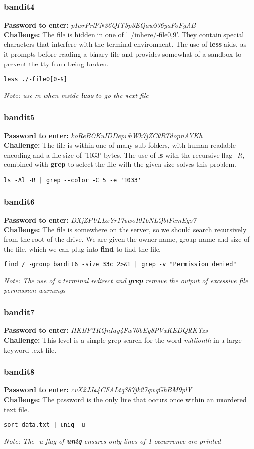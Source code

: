 \documentclass[a4paper]{article}
\newcommand{\pass}[1]{\textbf{Password to enter:} \textit{#1}\\}
\newcommand{\chall}{\textbf{Challenge:} }
\begin{document}
\subsubsection{bandit4}
\pass{pIwrPrtPN36QITSp3EQaw936yaFoFgAB}
\chall The file is hidden in one of '~/inhere/-file{0,9}'. They contain special characters that interfere with the terminal environment. The use of \textbf{less} aids, as it prompts before reading a binary file and provides somewhat of a sandbox to prevent the tty from being broken.
\begin{lstlisting}
less ./-file0[0-9]
\end{lstlisting}
\textit{Note: use :n when inside \textbf{less} to go the next file}

\subsubsection{bandit5}
\pass{koReBOKuIDDepwhWk7jZC0RTdopnAYKh}
\chall The file is within one of many sub-folders, with human readable encoding and a file size of '1033' bytes. The use of \textbf{ls} with the recursive flag \textit{-R}, combined with \textbf{grep} to select the file with the given size solves this problem.
\begin{lstlisting}
ls -Al -R | grep --color -C 5 -e '1033'
\end{lstlisting}

\subsubsection{bandit6}
\pass{DXjZPULLxYr17uwoI01bNLQbtFemEgo7}
\chall The file is somewhere on the server, so we should search recursively from the root of the drive. We are given the owner name, group name and size of the file, which we can plug into \textbf{find} to find the file.
\begin{lstlisting}
find / -group bandit6 -size 33c 2>&1 | grep -v "Permission denied"
\end{lstlisting}
\textit{Note: The use of a terminal redirect and \textbf{grep} remove the output of excessive file permission warnings}

\subsubsection{bandit7}
\pass{HKBPTKQnIay4Fw76bEy8PVxKEDQRKTzs}
\chall This level is a simple grep search for the word \textit{millionth} in a large keyword text file.

\subsubsection{bandit8}
\pass{cvX2JJa4CFALtqS87jk27qwqGhBM9plV}
\chall The password is the only line that occurs once within an unordered text file.
\begin{lstlisting}
sort data.txt | uniq -u
\end{lstlisting}
\textit{Note: The -u flag of \textbf{uniq} ensures only lines of 1 occurrence are printed}
\end{document}
